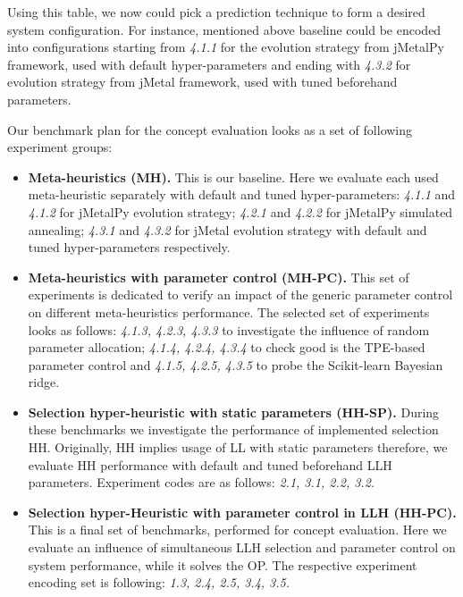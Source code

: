 Using this table, we now could pick a prediction technique to form a desired system configuration. For instance, mentioned above baseline could be encoded into configurations starting from \emph{4.1.1} for the evolution strategy from jMetalPy framework, used with default hyper-parameters and ending with \emph{4.3.2} for evolution strategy from jMetal framework, used with tuned beforehand parameters.

Our benchmark plan for the concept evaluation looks as a set of following experiment groups:
\begin{itemize}
	\item \textbf{Meta-heuristics (MH).} This is our baseline. Here we evaluate each used meta-heuristic separately with default and tuned hyper-parameters: \emph{4.1.1} and \emph{4.1.2} for jMetalPy evolution strategy;  \emph{4.2.1} and \emph{4.2.2} for jMetalPy simulated annealing; \emph{4.3.1} and \emph{4.3.2} for jMetal evolution strategy with default and tuned hyper-parameters respectively.

	\item \textbf{Meta-heuristics with parameter control (MH-PC).} This set of experiments is dedicated to verify an impact of the generic parameter control on different meta-heuristics performance. The selected set of experiments looks as follows: \emph{4.1.3, 4.2.3, 4.3.3} to investigate the influence of random parameter allocation; \emph{4.1.4, 4.2.4, 4.3.4} to check good is the TPE-based parameter control and \emph{4.1.5, 4.2.5, 4.3.5} to probe the Scikit-learn Bayesian ridge.

	\item \textbf{Selection hyper-heuristic with static parameters (HH-SP).} During these benchmarks we investigate the performance of implemented selection HH. Originally, HH implies usage of LL with static parameters therefore, we evaluate HH performance with default and tuned beforehand LLH parameters. Experiment codes are as follows: \emph{2.1, 3.1, 2.2, 3.2.}
	
	\item \textbf{Selection hyper-Heuristic with parameter control in LLH (HH-PC).} This is a final set of benchmarks, performed for concept evaluation. Here we evaluate an influence of simultaneous LLH selection and parameter control on system performance, while it solves the OP. The respective experiment encoding set is following: \emph{1.3, 2.4, 2.5, 3.4, 3.5.}
\end{itemize}


